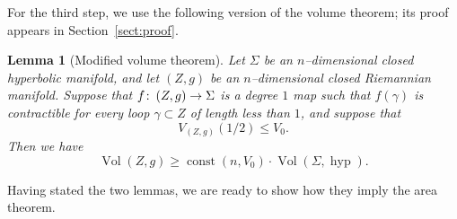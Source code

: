 \documentclass[12pt]{amsart}
\makeatletter
\newtheorem*{rep@theorem}{{Lemma} \ref##}
\newtheorem{lem}[dfn]{Lemma}
	{\newenvironment{rep{lem}}[1]{ } \begin{rep@theorem}} \end{rep@theorem}}
\numberwithin{equation}{section}
\makeatother
\begin{document}
For the third step, we use the following version of the volume theorem; its proof appears in Section~\ref{sect:proof}.

 \begin{lem}[Modified volume theorem]\label{modified-volume}
 Let $\Sigma$ be an $n$--dimensional closed hyperbolic manifold, and let $(Z, g)$ be an $n$--dimensional closed Riemannian manifold.  Suppose that $f {\colon\thinspace} (Z, g) \rightarrow \Sigma$ is a degree $1$ map such that $f(\gamma)$ is contractible for every loop $\gamma \subset Z$ of length less than $1$, and suppose that
\[V_{(Z, g)}(1/2) \leq V_0.\]
Then we have
\[\operatorname{Vol} (Z, g) \geq \operatorname{const}(n, V_0) \cdot \operatorname{Vol}(\Sigma, \operatorname{hyp}).\]
\end{lem}

Having stated the two lemmas, we are ready to show how they imply the area theorem.
\end{document}
